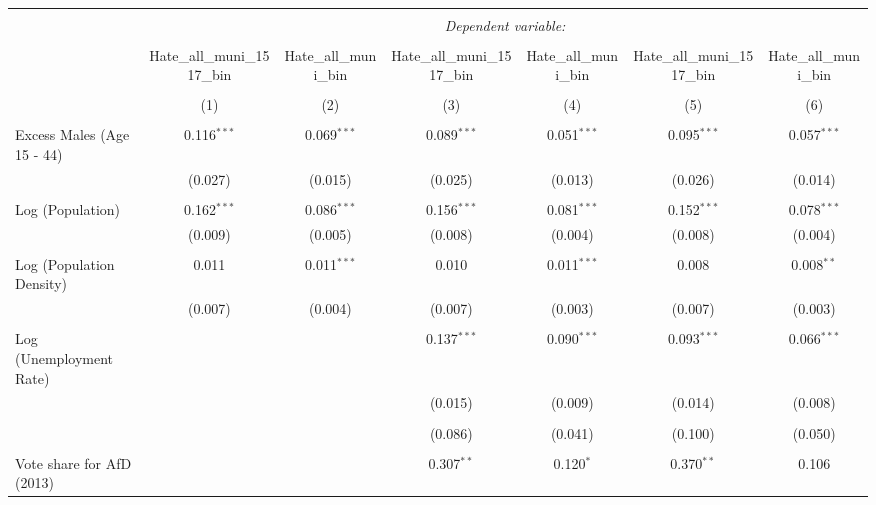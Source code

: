 
\begin{table}[!htbp] \centering 
  \caption{} 
  \label{} 
\begin{tabular}{@{\extracolsep{5pt}}lcccccc} 
\\[-1.8ex]\hline 
\hline \\[-1.8ex] 
 & \multicolumn{6}{c}{\textit{Dependent variable:}} \\ 
\cline{2-7} 
\\[-1.8ex] & Hate\_all\_muni\_1517\_bin & Hate\_all\_muni\_bin & Hate\_all\_muni\_1517\_bin & Hate\_all\_muni\_bin & Hate\_all\_muni\_1517\_bin & Hate\_all\_muni\_bin \\ 
\\[-1.8ex] & (1) & (2) & (3) & (4) & (5) & (6)\\ 
\hline \\[-1.8ex] 
 Excess Males (Age 15 - 44) & 0.116$^{***}$ & 0.069$^{***}$ & 0.089$^{***}$ & 0.051$^{***}$ & 0.095$^{***}$ & 0.057$^{***}$ \\ 
  & (0.027) & (0.015) & (0.025) & (0.013) & (0.026) & (0.014) \\ 
  & & & & & & \\ 
 Log (Population) & 0.162$^{***}$ & 0.086$^{***}$ & 0.156$^{***}$ & 0.081$^{***}$ & 0.152$^{***}$ & 0.078$^{***}$ \\ 
  & (0.009) & (0.005) & (0.008) & (0.004) & (0.008) & (0.004) \\ 
  & & & & & & \\ 
 Log (Population Density) & 0.011 & 0.011$^{***}$ & 0.010 & 0.011$^{***}$ & 0.008 & 0.008$^{**}$ \\ 
  & (0.007) & (0.004) & (0.007) & (0.003) & (0.007) & (0.003) \\ 
  & & & & & & \\ 
 Log (Unemployment Rate) &  &  & 0.137$^{***}$ & 0.090$^{***}$ & 0.093$^{***}$ & 0.066$^{***}$ \\ 
  &  &  & (0.015) & (0.009) & (0.014) & (0.008) \\ 
  & & & & & & \\ 
  &  &  & (0.086) & (0.041) & (0.100) & (0.050) \\ 
  & & & & & & \\ 
 Vote share for AfD (2013) &  &  & 0.307$^{**}$ & 0.120$^{*}$ & 0.370$^{**}$ & 0.106 \\ 

\end{tabular}
\end{table}
